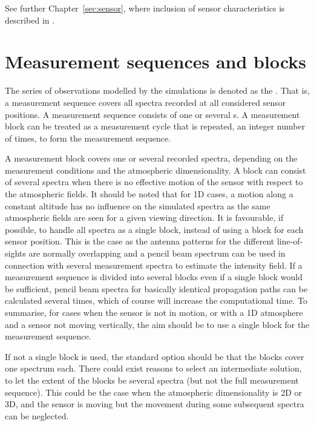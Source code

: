 See further Chapter~\ref{sec:sensor}, where inclusion of sensor characteristics
is described in .



\section{Measurement sequences and blocks}
\label{sec:fm_defs:seqsandblocks}

The series of observations modelled by the simulations is denoted as the
. That is, a measurement sequence covers all
spectra recorded at all considered sensor positions. A measurement sequence
consists of one or several s. A measurement block
can be treated as a measurement cycle that is repeated, an integer number of
times, to form the measurement sequence.

A measurement block covers one or several recorded spectra, depending
on the measurement conditions and the atmospheric dimensionality. A
block can consist of several spectra when there is no effective motion
of the sensor with respect to the atmospheric fields. It should be
noted that for 1D cases, a motion along a constant altitude has no
influence on the simulated spectra as the same atmospheric fields are
seen for a given viewing direction. It is favourable, if possible, to
handle all spectra as a single block, instead of using a block for
each sensor position. This is the case as the antenna patterns for the
different line-of-sights are normally overlapping and a pencil beam
spectrum can be used in connection with several measurement spectra to
estimate the intensity field. If a measurement sequence is divided
into several blocks even if a single block would be sufficient, pencil
beam spectra for basically identical propagation paths can be
calculated several times, which of course will increase the
computational time. To summarise, for cases when the sensor is not in
motion, or with a 1D atmosphere and a sensor not moving vertically,
the aim should be to use a single block for the measurement sequence.

If not a single block is used, the standard option should be that the
blocks cover one spectrum each. There could exist reasons to select an
intermediate solution, to let the extent of the blocks be several
spectra (but not the full measurement sequence). This could be the
case when the atmospheric dimensionality is 2D or 3D, and the sensor
is moving but the movement during some subsequent spectra can be
neglected. 


